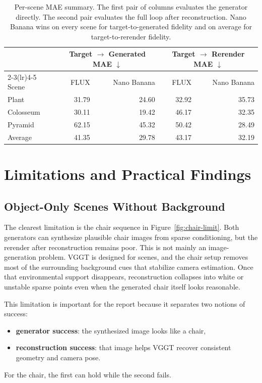 \documentclass[11pt]{article}
\begin{document}
\begin{table}[H]
  \centering
  \small
  \setlength{\tabcolsep}{6pt}
  \begin{tabular}{lrrrr}
    \toprule
    & \multicolumn{2}{c}{Target $\rightarrow$ Generated MAE $\downarrow$} & \multicolumn{2}{c}{Target $\rightarrow$ Rerender MAE $\downarrow$} \\
    \cmidrule(lr){2-3}\cmidrule(lr){4-5}
    Scene & {FLUX} & {Nano Banana} & {FLUX} & {Nano Banana} \\
    \midrule
    Plant     & 31.79 & 24.60 & 32.92 & 35.73 \\
    Colosseum & 30.11 & 19.42 & 46.17 & 32.35 \\
    Pyramid   & 62.15 & 45.32 & 50.42 & 28.49 \\
    \midrule
    Average   & 41.35 & 29.78 & 43.17 & 32.19 \\
    \bottomrule
  \end{tabular}
  \caption{Per-scene MAE summary. The first pair of columns evaluates the generator directly. The second pair evaluates the full loop after reconstruction. Nano Banana wins on every scene for target-to-generated fidelity and on average for target-to-rerender fidelity.}
  \label{tab:scene-summary}
\end{table}

\section{Limitations and Practical Findings}

\subsection{Object-Only Scenes Without Background}
The clearest limitation is the chair sequence in Figure~\ref{fig:chair-limit}. Both generators can synthesize plausible chair images from sparse conditioning, but the rerender after reconstruction remains poor. This is not mainly an image-generation problem. VGGT is designed for scenes, and the chair setup removes most of the surrounding background cues that stabilize camera estimation. Once that environmental support disappears, reconstruction collapses into white or unstable sparse points even when the generated chair itself looks reasonable.

This limitation is important for the report because it separates two notions of success:
\begin{itemize}
  \item \textbf{generator success}: the synthesized image looks like a chair,
  \item \textbf{reconstruction success}: that image helps VGGT recover consistent geometry and camera pose.
\end{itemize}
For the chair, the first can hold while the second fails.
\end{document}
